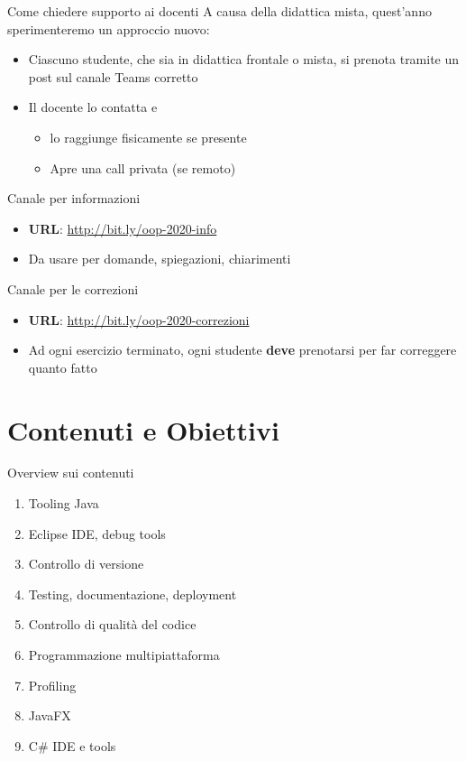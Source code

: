 \documentclass[presentation]{beamer}
\begin{document}
\begin{frame}{Come chiedere supporto ai docenti}
    A causa della didattica mista, quest'anno sperimenteremo un approccio nuovo:
    \begin{itemize}
        \item Ciascuno studente, che sia in didattica frontale o mista, si prenota tramite un post sul canale Teams corretto
        \item Il docente lo contatta e
        \begin{itemize}
            \item lo raggiunge fisicamente se presente
            \item Apre una call privata (se remoto)
        \end{itemize}
    \end{itemize}
    \begin{block}{Canale per informazioni}
        \begin{itemize}
            \item \textbf{URL}: \url{http://bit.ly/oop-2020-info}
            \item Da usare per domande, spiegazioni, chiarimenti
        \end{itemize}
    \end{block}
    \begin{block}{Canale per le correzioni}
        \begin{itemize}
            \item \textbf{URL}: \url{http://bit.ly/oop-2020-correzioni}
            \item Ad ogni esercizio terminato, ogni studente \textbf{deve} prenotarsi per far correggere quanto fatto
        \end{itemize}
    \end{block}
\end{frame}


\section{Contenuti e Obiettivi}

\begin{frame}{Overview sui contenuti}

\begin{enumerate}
    \item Tooling Java
    \item Eclipse IDE, debug tools
    \item Controllo di versione
    \item Testing, documentazione, deployment
    \item Controllo di qualità del codice
    \item Programmazione multipiattaforma
    \item Profiling
    \item JavaFX
    \item C\# IDE e tools
\end{enumerate}

\end{frame}
\end{document}
